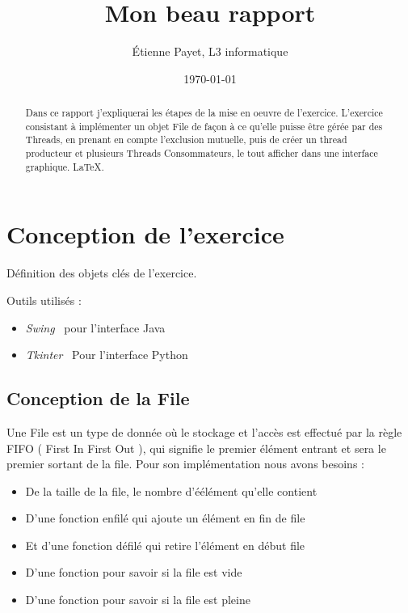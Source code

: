 \documentclass{article}
\title{Mon beau rapport}
\author{\'Etienne Payet, L3 informatique}
\date{\today}
\begin{document}
\maketitle %


\begin{abstract}
 Dans ce rapport j'expliquerai les étapes de la mise en oeuvre de l'exercice. L'exercice consistant à implémenter un objet File de façon à ce qu'elle puisse être gérée par des Threads,  en prenant en compte l'exclusion mutuelle, puis de créer un thread producteur et plusieurs Threads Consommateurs, le tout afficher dans une interface graphique.  \LaTeX.
\end{abstract}

\section{Conception de l'exercice}
\label{section:hello} %

Définition des objets clés de l'exercice.

Outils utilisés :
\begin{itemize}
\item \textit{Swing}~\cite{swingDoc}
  pour l'interface Java
\item \textit{Tkinter}~\cite{tkinterDoc} Pour l'interface Python
\end{itemize}

\subsection{Conception de la File}


Une File est un type de donnée où le stockage et l'accès est effectué 
par la règle FIFO ( First In First Out ), qui signifie le premier élément entrant et sera le premier sortant de la file. Pour son implémentation nous avons besoins : 
\begin{itemize}
\item De la taille de la file, le nombre d'éélément qu'elle contient
\item D'une fonction enfilé qui ajoute un élément en fin de file
\item Et d'une fonction défilé qui retire l'élément en début file
\item D'une fonction pour savoir si la file est vide
\item D'une fonction pour savoir si la file est pleine
\end{itemize}
\end{document}
